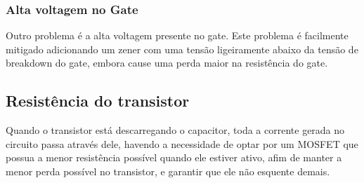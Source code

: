 \subsubsection{Alta voltagem no Gate}
Outro problema é a alta voltagem presente no gate. Este problema é facilmente mitigado adicionando um zener com uma tensão ligeiramente abaixo da tensão de breakdown do gate, embora cause uma perda maior na resistência do gate.

\subsection{Resistência do transistor}
Quando o transistor está descarregando o capacitor, toda a corrente gerada no circuito passa através dele, havendo a necessidade de optar por um MOSFET que possua a menor resistência possível quando ele estiver ativo, afim de manter a menor perda possível no transistor, e garantir que ele não esquente demais.